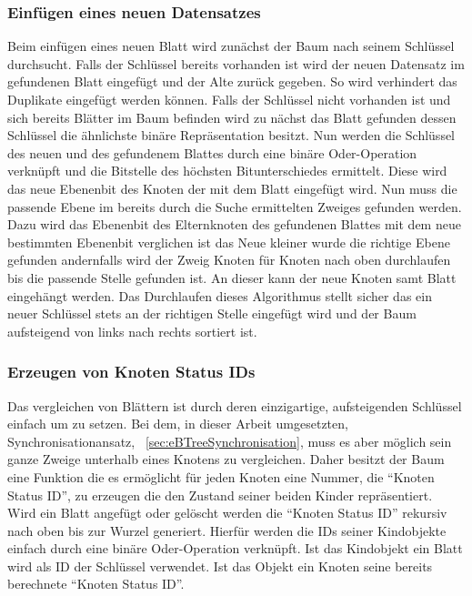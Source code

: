 \documentclass[a4paper,11pt,oneside,%
headsepline,												%
footsepline,												%
bibtotocnumbered									%
]{scrreprt}
\begin{document}
\subsubsection{Einfügen eines neuen Datensatzes}
Beim einfügen eines neuen Blatt wird zunächst der Baum nach seinem Schlüssel durchsucht. Falls der Schlüssel bereits vorhanden ist wird der neuen Datensatz im gefundenen Blatt eingefügt und der Alte zurück gegeben. So wird verhindert das Duplikate eingefügt werden können. Falls der Schlüssel nicht vorhanden ist und sich bereits Blätter im Baum befinden wird zu nächst das Blatt gefunden dessen Schlüssel die ähnlichste binäre Repräsentation besitzt. Nun werden die Schlüssel des neuen und des gefundenem Blattes durch eine binäre Oder-Operation verknüpft und  die Bitstelle des höchsten Bitunterschiedes ermittelt. Diese wird das neue Ebenenbit des Knoten der mit dem Blatt eingefügt wird. Nun muss die passende Ebene im bereits durch die Suche ermittelten Zweiges gefunden werden. Dazu wird das Ebenenbit des Elternknoten des gefundenen Blattes mit dem neue bestimmten Ebenenbit verglichen ist das Neue kleiner wurde die richtige Ebene gefunden andernfalls wird der Zweig Knoten für Knoten nach oben durchlaufen bis die passende Stelle gefunden ist. An dieser kann der neue Knoten samt Blatt eingehängt werden. Das Durchlaufen dieses Algorithmus stellt sicher das ein neuer Schlüssel stets an der richtigen Stelle eingefügt wird und der Baum aufsteigend von links nach rechts sortiert ist.

\subsubsection{Erzeugen von Knoten Status IDs}
Das vergleichen von Blättern ist durch deren einzigartige, aufsteigenden Schlüssel einfach um zu setzen. Bei dem, in dieser Arbeit umgesetzten, Synchronisationansatz, ~\autoref{sec:eBTreeSynchronisation}, muss es aber möglich sein ganze Zweige unterhalb eines Knotens zu vergleichen. Daher besitzt der Baum eine Funktion die es ermöglicht für jeden Knoten eine Nummer, die \enquote{Knoten Status ID}, zu erzeugen die den Zustand seiner beiden Kinder repräsentiert.\\

Wird ein Blatt angefügt oder gelöscht werden die \enquote{Knoten Status ID} rekursiv nach oben bis zur Wurzel generiert. Hierfür werden die IDs seiner Kindobjekte einfach durch eine binäre Oder-Operation verknüpft. Ist das Kindobjekt ein Blatt wird als ID der Schlüssel verwendet. Ist das Objekt ein Knoten seine bereits berechnete \enquote{Knoten Status ID}. 
\end{document}
